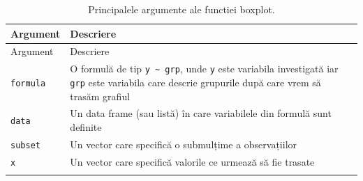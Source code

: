 \documentclass[]{article}
\begin{document}
\begin{longtable}[]{@{}ll@{}}
\caption{Principalele argumente ale functiei boxplot.}\tabularnewline
\toprule
\begin{minipage}[b]{0.19\columnwidth}\raggedright
Argument\strut
\end{minipage} & \begin{minipage}[b]{0.75\columnwidth}\raggedright
Descriere\strut
\end{minipage}\tabularnewline
\midrule
\endfirsthead
\toprule
\begin{minipage}[b]{0.19\columnwidth}\raggedright
Argument\strut
\end{minipage} & \begin{minipage}[b]{0.75\columnwidth}\raggedright
Descriere\strut
\end{minipage}\tabularnewline
\midrule
\endhead
\begin{minipage}[t]{0.19\columnwidth}\raggedright
\texttt{formula}\strut
\end{minipage} & \begin{minipage}[t]{0.75\columnwidth}\raggedright
O formulă de tip \texttt{y\ \textasciitilde{}\ grp}, unde \texttt{y}
este variabila investigată iar \texttt{grp} este variabila care descrie
grupurile după care vrem să trasăm grafiul\strut
\end{minipage}\tabularnewline
\begin{minipage}[t]{0.19\columnwidth}\raggedright
\texttt{data}\strut
\end{minipage} & \begin{minipage}[t]{0.75\columnwidth}\raggedright
Un data frame (sau listă) în care variabilele din formulă sunt
definite\strut
\end{minipage}\tabularnewline
\begin{minipage}[t]{0.19\columnwidth}\raggedright
\texttt{subset}\strut
\end{minipage} & \begin{minipage}[t]{0.75\columnwidth}\raggedright
Un vector care specifică o submulțime a observațiilor\strut
\end{minipage}\tabularnewline
\begin{minipage}[t]{0.19\columnwidth}\raggedright
\texttt{x}\strut
\end{minipage} & \begin{minipage}[t]{0.75\columnwidth}\raggedright
Un vector care specifică valorile ce urmează să fie trasate\strut
\end{minipage}\tabularnewline
\begin{minipage}[t]{0.19\columnwidth}\raggedright

\end{minipage}
\end{longtable}
\end{document}
